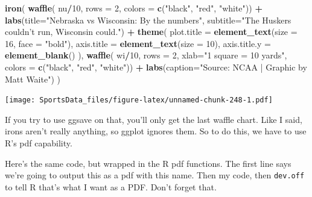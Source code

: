 \documentclass[]{book}
\newenvironment{Shaded}{\begin{snugshade}}{\end{snugshade}}
\newcommand{\KeywordTok}[1]{\textcolor[rgb]{0.13,0.29,0.53}{\textbf{#1}}}
\newcommand{\DataTypeTok}[1]{\textcolor[rgb]{0.13,0.29,0.53}{#1}}
\newcommand{\DecValTok}[1]{\textcolor[rgb]{0.00,0.00,0.81}{#1}}
\newcommand{\StringTok}[1]{\textcolor[rgb]{0.31,0.60,0.02}{#1}}
\newcommand{\OperatorTok}[1]{\textcolor[rgb]{0.81,0.36,0.00}{\textbf{#1}}}
\newcommand{\NormalTok}[1]{#1}
\begin{document}
\begin{Shaded}
\begin{Highlighting}[]
\KeywordTok{iron}\NormalTok{(}
 \KeywordTok{waffle}\NormalTok{(}
\NormalTok{   nu}\OperatorTok{/}\DecValTok{10}\NormalTok{, }
   \DataTypeTok{rows =} \DecValTok{2}\NormalTok{, }
   \DataTypeTok{colors =} \KeywordTok{c}\NormalTok{(}\StringTok{"black"}\NormalTok{, }\StringTok{"red"}\NormalTok{, }\StringTok{"white"}\NormalTok{)) }\OperatorTok{+}\StringTok{ }
\StringTok{   }\KeywordTok{labs}\NormalTok{(}\DataTypeTok{title=}\StringTok{"Nebraska vs Wisconsin: By the numbers"}\NormalTok{, }\DataTypeTok{subtitle=}\StringTok{"The Huskers couldn't run, Wisconsin could."}\NormalTok{) }\OperatorTok{+}\StringTok{ }
\StringTok{   }\KeywordTok{theme}\NormalTok{(}
    \DataTypeTok{plot.title =} \KeywordTok{element_text}\NormalTok{(}\DataTypeTok{size =} \DecValTok{16}\NormalTok{, }\DataTypeTok{face =} \StringTok{"bold"}\NormalTok{),}
    \DataTypeTok{axis.title =} \KeywordTok{element_text}\NormalTok{(}\DataTypeTok{size =} \DecValTok{10}\NormalTok{),}
    \DataTypeTok{axis.title.y =} \KeywordTok{element_blank}\NormalTok{()}
\NormalTok{  ),}
 \KeywordTok{waffle}\NormalTok{(}
\NormalTok{   wi}\OperatorTok{/}\DecValTok{10}\NormalTok{, }
   \DataTypeTok{rows =} \DecValTok{2}\NormalTok{, }
   \DataTypeTok{xlab=}\StringTok{"1 square = 10 yards"}\NormalTok{, }
   \DataTypeTok{colors =} \KeywordTok{c}\NormalTok{(}\StringTok{"black"}\NormalTok{, }\StringTok{"red"}\NormalTok{, }\StringTok{"white"}\NormalTok{)) }\OperatorTok{+}\StringTok{ }\KeywordTok{labs}\NormalTok{(}\DataTypeTok{caption=}\StringTok{"Source: NCAA | Graphic by Matt Waite"}\NormalTok{)}
\NormalTok{) }
\end{Highlighting}
\end{Shaded}

\texttt{[image: SportsData\_files/figure-latex/unnamed-chunk-248-1.pdf]}

If you try to use ggsave on that, you'll only get the last waffle chart.
Like I said, irons aren't really anything, so ggplot ignores them. So to
do this, we have to use R's pdf capability.

Here's the same code, but wrapped in the R pdf functions. The first line
says we're going to output this as a pdf with this name. Then my code,
then \texttt{dev.off} to tell R that's what I want as a PDF. Don't
forget that.
\end{document}
